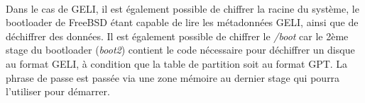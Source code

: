 \paragraph{}
Dans le cas de GELI, il est également possible de chiffrer la racine du 
système, le bootloader de FreeBSD étant capable de lire les métadonnées GELI, 
ainsi que de déchiffrer des données. Il est également possible de chiffrer le 
{\em /boot} car le 2ème stage du bootloader ({\em boot2}) contient le code 
nécessaire pour déchiffrer un disque au format GELI, à condition que la table 
de partition soit au format GPT. La phrase de passe est passée via une zone 
mémoire au dernier stage qui pourra l'utiliser pour démarrer.

